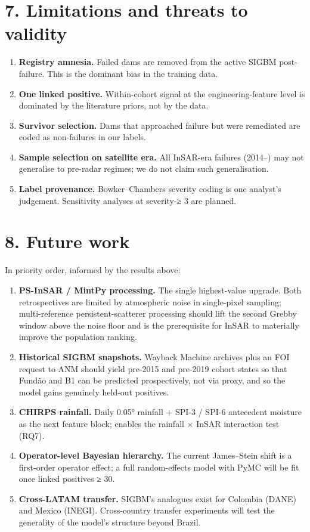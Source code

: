 \documentclass[
  11pt]{article}
\providecommand{\tightlist}{%
  \setlength{\itemsep}{0pt}\setlength{\parskip}{0pt}}
\begin{document}
\section{7. Limitations and threats to
validity}\label{limitations-and-threats-to-validity}

\begin{enumerate}
\def\labelenumi{\arabic{enumi}.}
\tightlist
\item
  \textbf{Registry amnesia.} Failed dams are removed from the active
  SIGBM post-failure. This is the dominant bias in the training data.
\item
  \textbf{One linked positive.} Within-cohort signal at the
  engineering-feature level is dominated by the literature priors, not
  by the data.
\item
  \textbf{Survivor selection.} Dams that approached failure but were
  remediated are coded as non-failures in our labels.
\item
  \textbf{Sample selection on satellite era.} All InSAR-era failures
  (2014--) may not generalise to pre-radar regimes; we do not claim such
  generalisation.
\item
  \textbf{Label provenance.} Bowker--Chambers severity coding is one
  analyst's judgement. Sensitivity analyses at severity-≥ 3 are planned.
\end{enumerate}

\section{8. Future work}\label{future-work}

In priority order, informed by the results above:

\begin{enumerate}
\def\labelenumi{\arabic{enumi}.}
\tightlist
\item
  \textbf{PS-InSAR / MintPy processing.} The single highest-value
  upgrade. Both retrospectives are limited by atmospheric noise in
  single-pixel sampling; multi-reference persistent-scatterer processing
  should lift the second Grebby window above the noise floor and is the
  prerequisite for InSAR to materially improve the population ranking.
\item
  \textbf{Historical SIGBM snapshots.} Wayback Machine archives plus an
  FOI request to ANM should yield pre-2015 and pre-2019 cohort states so
  that Fundão and B1 can be predicted prospectively, not via proxy, and
  so the model gains genuinely held-out positives.
\item
  \textbf{CHIRPS rainfall.} Daily 0.05° rainfall + SPI-3 / SPI-6
  antecedent moisture as the next feature block; enables the rainfall ×
  InSAR interaction test (RQ7).
\item
  \textbf{Operator-level Bayesian hierarchy.} The current James--Stein
  shift is a first-order operator effect; a full random-effects model
  with PyMC will be fit once linked positives ≥ 30.
\item
  \textbf{Cross-LATAM transfer.} SIGBM's analogues exist for Colombia
  (DANE) and Mexico (INEGI). Cross-country transfer experiments will
  test the generality of the model's structure beyond Brazil.
\end{enumerate}
\end{document}

